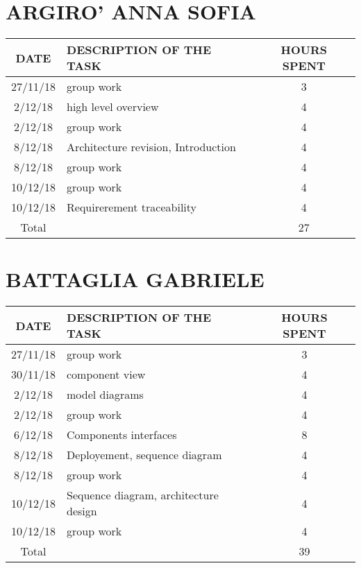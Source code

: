 \section{ARGIRO' ANNA SOFIA}
\begin{table}[h!]
\begin{tabular}{|c|p{3in}|c|}
\hline
\textbf{DATE} &\textbf{DESCRIPTION OF THE TASK} & \textbf{HOURS SPENT}\\
\hline
27/11/18 & group work & 3\\
\hline
2/12/18 & high level overview & 4\\
\hline
2/12/18 & group work & 4\\
\hline
8/12/18 & Architecture revision, Introduction & 4\\
\hline
8/12/18 & group work & 4\\
\hline
10/12/18 & group work & 4\\
\hline
10/12/18 & Requirerement traceability & 4\\
\hline
Total & & 27\\
\hline
\end{tabular}
\end{table}

\clearpage


\section{BATTAGLIA GABRIELE}
\begin{table}[h!]
	\begin{tabular}{|c|p{3in}|c|}
\hline
\textbf{DATE} &\textbf{DESCRIPTION OF THE TASK} & \textbf{HOURS SPENT}\\
\hline
27/11/18 & group work & 3\\
\hline
30/11/18 & component view & 4\\
\hline
2/12/18 & model diagrams & 4\\
\hline
2/12/18 & group work & 4\\
\hline
6/12/18 & Components interfaces & 8\\
\hline
8/12/18 & Deployement, sequence diagram & 4\\
\hline
8/12/18 & group work & 4\\
\hline
10/12/18 & Sequence diagram, architecture design  & 4\\
\hline
10/12/18 & group work & 4\\
\hline
Total & & 39\\
\hline
	\end{tabular}
\end{table}

